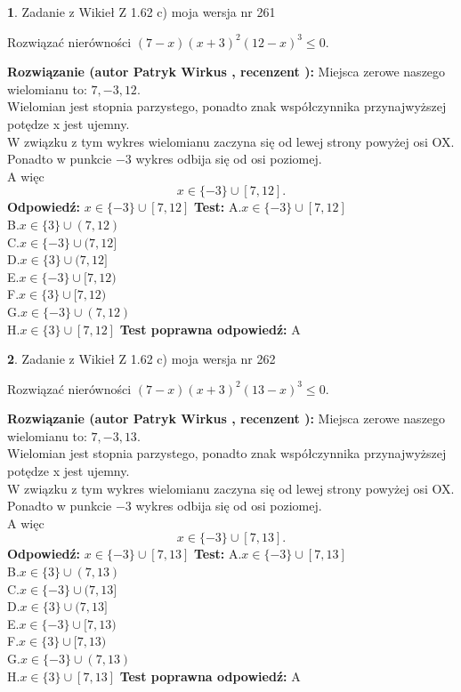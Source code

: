\documentclass[12pt, a4paper]{article}
\theoremstyle{definition} %
\newtheorem{zad}{}
\newcommand{\zadStart}[1]{\begin{zad}#1\newline}
\newcommand{\zadStop}{\end{zad}}
\newcommand{\rozwStart}[2]{\noindent \textbf{Rozwiązanie (autor #1 , recenzent #2): }\newline}
\newcommand{\rozwStop}{\newline}
\newcommand{\odpStart}{\noindent \textbf{Odpowiedź:}\newline}
\newcommand{\odpStop}{\newline}
\newcommand{\testStart}{\noindent \textbf{Test:}\newline}
\newcommand{\testStop}{\newline}
\newcommand{\kluczStart}{\noindent \textbf{Test poprawna odpowiedź:}\newline}
\newcommand{\kluczStop}{\newline}
\begin{document}
\zadStart{Zadanie z Wikieł Z 1.62 c) moja wersja nr 261}

Rozwiązać nierówności $(7-x)(x+3)^{2}(12-x)^{3}\le0$.
\zadStop
\rozwStart{Patryk Wirkus}{}
Miejsca zerowe naszego wielomianu to: $7, -3, 12$.\\
Wielomian jest stopnia parzystego, ponadto znak współczynnika przy\linebreak najwyższej potędze x jest ujemny.\\ W związku z tym wykres wielomianu zaczyna się od lewej strony powyżej osi OX.\\
Ponadto w punkcie $-3$ wykres odbija się od osi poziomej.\\
A więc $$x \in \{-3\} \cup [7,12].$$
\rozwStop
\odpStart
$x \in \{-3\} \cup [7,12]$
\odpStop
\testStart
A.$x \in \{-3\} \cup [7,12]$\\
B.$x \in \{3\} \cup (7,12)$\\
C.$x \in \{-3\} \cup (7,12]$\\
D.$x \in \{3\} \cup (7,12]$\\
E.$x \in \{-3\} \cup [7,12)$\\
F.$x \in \{3\} \cup [7,12)$\\
G.$x \in \{-3\} \cup (7,12)$\\
H.$x \in \{3\} \cup [7,12]$
\testStop
\kluczStart
A
\kluczStop



\zadStart{Zadanie z Wikieł Z 1.62 c) moja wersja nr 262}

Rozwiązać nierówności $(7-x)(x+3)^{2}(13-x)^{3}\le0$.
\zadStop
\rozwStart{Patryk Wirkus}{}
Miejsca zerowe naszego wielomianu to: $7, -3, 13$.\\
Wielomian jest stopnia parzystego, ponadto znak współczynnika przy\linebreak najwyższej potędze x jest ujemny.\\ W związku z tym wykres wielomianu zaczyna się od lewej strony powyżej osi OX.\\
Ponadto w punkcie $-3$ wykres odbija się od osi poziomej.\\
A więc $$x \in \{-3\} \cup [7,13].$$
\rozwStop
\odpStart
$x \in \{-3\} \cup [7,13]$
\odpStop
\testStart
A.$x \in \{-3\} \cup [7,13]$\\
B.$x \in \{3\} \cup (7,13)$\\
C.$x \in \{-3\} \cup (7,13]$\\
D.$x \in \{3\} \cup (7,13]$\\
E.$x \in \{-3\} \cup [7,13)$\\
F.$x \in \{3\} \cup [7,13)$\\
G.$x \in \{-3\} \cup (7,13)$\\
H.$x \in \{3\} \cup [7,13]$
\testStop
\kluczStart
A
\kluczStop
\end{document}

